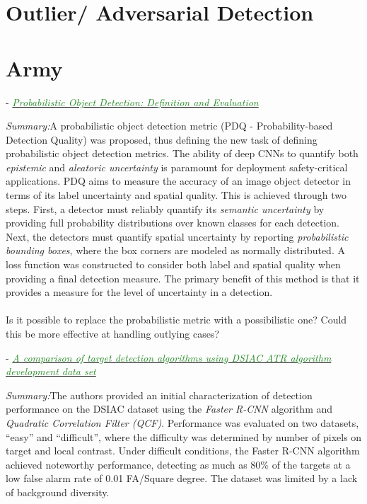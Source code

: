 \documentclass[]{article}
\newcommand{\paperentry}[4]{
            \hangindent=1cm
            \textcolor{red}{\cite{#1}} - \href{run:../References/#3}{\textcolor{ForestGreen}{\textit{#2}}}
            
            \noindent            
            \begin{minipage}[t]{0.1\linewidth}\hfill\end{minipage}
            \begin{minipage}[t]{0.8\linewidth}\textcolor{NavyBlue}{{\textit{Summary:}}}#4\end{minipage}
            \vspace{.25cm}
          }
\begin{document}
\section{Outlier/ Adversarial Detection}

\section{Army}

\paperentry{Hall2019ProbabilisticObjectDetection}
{Probabilistic Object Detection: Definition and Evaluation}
{Army/Hall2019ProbabilisticObjectDetection.pdf}
{A probabilistic object detection metric (PDQ - Probability-based Detection Quality) was proposed, thus defining the new task of defining probabilistic object detection metrics.  The ability of deep CNNs to quantify both \textit{epistemic} and \textit{aleatoric uncertainty} is paramount for deployment safety-critical applications.  PDQ aims to measure the accuracy of an image object detector in terms of its label uncertainty and spatial quality.  This is achieved through two steps.  First, a detector must reliably quantify its \textit{semantic uncertainty} by providing full probability distributions over known classes for each detection.  Next, the detectors must quantify spatial uncertainty by reporting \textit{probabilistic bounding boxes}, where the box corners are modeled as normally distributed.  A loss function was constructed to consider both label and spatial quality when providing a final detection measure.  The primary benefit of this method is that it provides a measure for the level of uncertainty in a detection. \\ \\ Is it possible to replace the probabilistic metric with a possibilistic one?  Could this be more effective at handling outlying cases?} 


\paperentry{Mahalanobis2019DSIACCharacterization}
{A comparison of target detection algorithms using DSIAC ATR algorithm development data set}
{Army/Mahalanobis2019DSIACCharacterization.pdf}
{The authors provided an initial characterization of detection performance on the DSIAC dataset using the \textit{Faster R-CNN} algorithm and \textit{Quadratic Correlation Filter (QCF)}.  Performance was evaluated on two datasets, ``easy'' and ``difficult'', where the difficulty was determined by number of pixels on target and local contrast.  Under difficult conditions, the Faster R-CNN algorithm achieved noteworthy performance, detecting as much as 80\% of the targets at a low false alarm rate of 0.01 FA/Square degree.  The dataset was limited by a lack of background diversity. }
\end{document}
